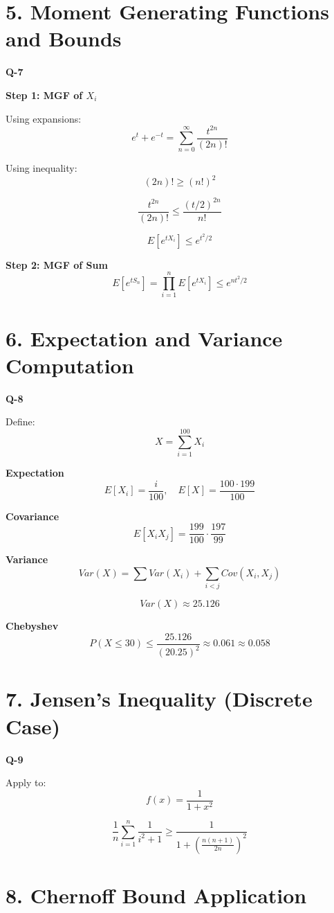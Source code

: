 \documentclass[12pt]{article}
\begin{document}
\section*{5. Moment Generating Functions and Bounds}

\textbf{Q-7}

\textbf{Step 1: MGF of $X_i$}

Using expansions:
\[
e^t + e^{-t} = \sum_{n=0}^{\infty} \frac{t^{2n}}{(2n)!}
\]

Using inequality:
\[
(2n)! \ge (n!)^2
\]

\[
\frac{t^{2n}}{(2n)!} \le \frac{(t/2)^{2n}}{n!}
\]

\[
E[e^{tX_i}] \le e^{t^2/2}
\]

\textbf{Step 2: MGF of Sum}
\[
E[e^{tS_n}] = \prod_{i=1}^n E[e^{tX_i}] \le e^{nt^2/2}
\]

\section*{6. Expectation and Variance Computation}

\textbf{Q-8}

Define:
\[
X = \sum_{i=1}^{100} X_i
\]

\textbf{Expectation}
\[
E[X_i] = \frac{i}{100}, \quad E[X] = \frac{100 \cdot 199}{100}
\]

\textbf{Covariance}
\[
E[X_i X_j] = \frac{199}{100} \cdot \frac{197}{99}
\]

\textbf{Variance}
\[
Var(X) = \sum Var(X_i) + \sum_{i<j} Cov(X_i, X_j)
\]

\[
Var(X) \approx 25.126
\]

\textbf{Chebyshev}
\[
P(X \le 30) \le \frac{25.126}{(20.25)^2} \approx 0.061 \approx 0.058
\]

\section*{7. Jensen’s Inequality (Discrete Case)}

\textbf{Q-9}

Apply to:
\[
f(x) = \frac{1}{1 + x^2}
\]

\[
\frac{1}{n} \sum_{i=1}^n \frac{1}{i^2 + 1} \ge \frac{1}{1 + \left(\frac{n(n+1)}{2n}\right)^2}
\]

\section*{8. Chernoff Bound Application}
\end{document}
